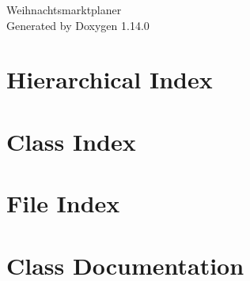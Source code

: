 \documentclass[twoside]{book}
\newcommand{\+}{\discretionary{\mbox{\scriptsize$\hookleftarrow$}}{}{}}
\newcommand{\clearemptydoublepage}{%
    \newpage{\pagestyle{empty}\cleardoublepage}%
  }
\begin{document}
  \raggedbottom
    \hypersetup{pageanchor=false,
                bookmarksnumbered=true,
                pdfencoding=unicode
               }
  \begin{titlepage}
  \vspace*{7cm}
  \begin{center}%
  {\Large Weihnachtsmarktplaner}\\
  \vspace*{1cm}
  {\large Generated by Doxygen 1.14.0}\\
  \end{center}
  \end{titlepage}
  \clearemptydoublepage
  \tableofcontents
  \clearemptydoublepage
  \hypersetup{pageanchor=true}
\chapter{Hierarchical Index}

\chapter{Class Index}

\chapter{File Index}

\chapter{Class Documentation}














































\end{document}
